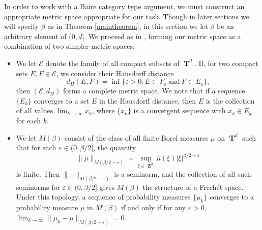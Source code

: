 \documentclass[12pt,reqno]{article}
\numberwithin{equation}{section}
\DeclareMathOperator{\ZZ}{\mathbf{Z}}
\DeclareMathOperator{\TT}{\mathbf{T}}
\begin{document}
In order to work with a Baire category type argument, we must construct an appropriate metric space appropriate for our task. Though in later sections we will specify $\beta$ as in Theorem \ref{maintheorem}, in this section we let $\beta$ be an arbitrary element of $(0,d]$. We proceed as in \cite{Korner2}, forming our metric space as a combination of two simpler metric spaces:
%
\begin{itemize}
    \item We let $\mathcal{E}$ denote the family of all compact subsets of $\TT^d$. If, for two compact sets $E,F \in \mathcal{E}$, we consider their Hausdorff distance
    \[ d_H(E,F) = \inf \{ \varepsilon > 0 : E \subset F_\varepsilon\ \text{and}\ F \subset E_\varepsilon \}, \]
    then $(\mathcal{E},d_H)$ forms a complete metric space. We note that if a sequence $\{ E_k \}$ converges to a set $E$ in the Hausdorff distance, then $E$ is the collection of all values $\lim_{k \to \infty} x_k$, where $\{ x_k \}$ is a convergent sequence with $x_k \in E_k$ for each $k$.

    \item We let $M(\beta)$ consist of the class of all finite Borel measures $\mu$ on $\TT^d$ such that for each $\varepsilon \in (0,\beta/2]$, the quantity
    \[ \| \mu \|_{M(\beta/2 - \varepsilon)} = \sup_{\xi \in \ZZ^d} \widehat{\mu}(\xi) |\xi|^{\beta/2 - \varepsilon} \]
    is finite. Then $\| \cdot \|_{M(\beta/2 - \varepsilon)}$ is a seminorm, and the collection of all such seminorms for $\varepsilon \in (0,\beta/2]$ gives $M(\beta)$ the structure of a Frech\'{e}t space. Under this topology, a sequence of probability measures $\{ \mu_k \}$ converges to a probability measure $\mu$ in $M(\beta)$ if and only if for any $\varepsilon > 0$, $\lim_{k \to \infty} \| \mu_k - \mu \|_{M(\beta/2 - \varepsilon)} = 0$.
\end{itemize}
\end{document}
